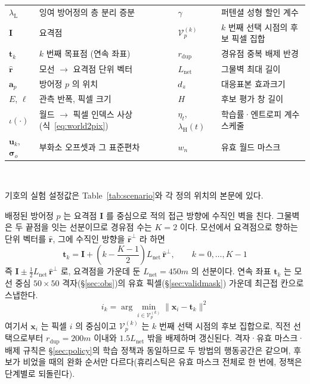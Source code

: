 \begin{table}[tp]
{\begin{tabular}{@{}ll@{\hspace{1.2em}}ll@{}}
$\lambda_{\mathrm{L}}$ & 잉여 방어정의 층 분리 증분           & $\gamma$       & 퍼텐셜 성형 할인 계수 \\
\addlinespace[2pt]
$\mathbf{I}$   & 요격점                               & $\mathcal{V}^{(k)}_p$ & $k$ 번째 선택 시점의 후보 픽셀 집합 \\
$\mathbf{t}_k$ & $k$ 번째 목표점 (연속 좌표)          & $r_{\mathrm{dup}}$ & 경유점 중복 배제 반경 \\
$\hat{\mathbf{r}}$ & 모선 $\to$ 요격점 단위 벡터      & $L_{\mathrm{net}}$ & 그물벽 최대 길이 \\
$\mathbf{a}_p$ & 방어정 $p$ 의 위치                   & $d_z$          & 대응표본 효과크기 \\
\addlinespace[2pt]
$E$, $\ell$    & 관측 반폭, 픽셀 크기                 & $H$           & 후보 평가 창 길이 \\
$\iota(\cdot)$ & 월드 $\to$ 픽셀 인덱스 사상 (식~\ref{eq:world2pix}) & $\eta_t$, $\lambda_{\mathrm{H}}(t)$ & 학습률·엔트로피 계수 스케줄 \\
$\mathbf{u}_k$, $\boldsymbol{\sigma}_o$ & 부화소 오프셋과 그 표준편차 & $w_n$ & 유효 월드 마스크 \\
\bottomrule
\end{tabular}
}
\\[3pt]
\begin{minipage}{\linewidth}\footnotesize
기호의 실험 설정값은 Table~\ref{tab:scenario}와 각 정의 위치의 본문에 있다.
\end{minipage}
\end{table}

배정된 방어정 $p$ 는 요격점 $\mathbf{I}$ 를 중심으로 적의 접근 방향에 수직인 벽을 친다.
그물벽은 두 끝점을 잇는 선분이므로 경유점 수는 $K = 2$ 이다. 모선에서 요격점으로 향하는
단위 벡터를 $\hat{\mathbf{r}}$, 그에 수직인 방향을 $\hat{\mathbf{r}}^{\perp}$ 라 하면
\begin{equation}
\mathbf{t}_k = \mathbf{I} + \left(k - \frac{K-1}{2}\right) L_{\mathrm{net}}\,
               \hat{\mathbf{r}}^{\perp}, \qquad k = 0,\dots,K-1
\label{eq:heur_target}
\end{equation}
즉 $\mathbf{I} \pm \tfrac{1}{2} L_{\mathrm{net}}\, \hat{\mathbf{r}}^{\perp}$ 로, 요격점을
가운데 둔 $L_{\mathrm{net}} = 450\unit{m}$ 의 선분이다. 연속 좌표 $\mathbf{t}_k$ 는 모선
중심 $50\times50$ 격자(\S\ref{sec:obs})의 유효 픽셀(\S\ref{sec:validmask}) 가운데 최근접
칸으로 스냅한다.
\begin{equation}
i_k = \arg\min_{i \in \mathcal{V}^{(k)}_p} \lVert \mathbf{x}_i - \mathbf{t}_k \rVert^2
\end{equation}
여기서 $\mathbf{x}_i$ 는 픽셀 $i$ 의 중심이고 $\mathcal{V}^{(k)}_p$ 는 $k$ 번째 선택 시점의
후보 집합으로, 직전 선택으로부터 $r_{\mathrm{dup}} = 200\unit{m}$ 이내와 $1.5 L_{\mathrm{net}}$
밖을 배제하며 갱신된다. 격자·유효 마스크·배제 규칙은 \S\ref{sec:policy}의 학습 정책과
동일하므로 두 방법의 행동공간은 같으며, 후보가 비었을 때의 완화 순서만 다르다(휴리스틱은
유효 마스크 전체로 한 번에, 정책은 단계별로 되돌린다).

